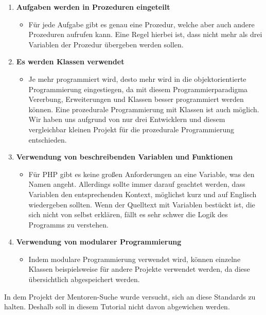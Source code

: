 \begin{enumerate}
	\item {\bf Aufgaben werden in Prozeduren eingeteilt}
	\begin{itemize}
	 \item Für jede Aufgabe gibt es genau eine Prozedur, welche aber auch andere Prozeduren aufrufen kann. Eine Regel hierbei ist, dass nicht mehr als drei Variablen der Prozedur übergeben werden sollen. 
	\end{itemize}
	\item {\bf Es werden Klassen verwendet}
	\begin{itemize}
		\item Je mehr programmiert wird, desto mehr wird in die objektorientierte Programmierung eingestiegen, da mit diesem Programmierparadigma Vererbung, Erweiterungen und Klassen besser programmiert werden können. Eine prozedurale Programmierung mit Klassen ist auch möglich. Wir haben uns aufgrund von nur drei Entwicklern und diesem vergleichbar kleinen Projekt für die prozedurale Programmierung entschieden.
	\end{itemize}
	\item {\bf Verwendung von beschreibenden Variablen und Funktionen}
	\begin{itemize}
		\item Für \gls{PHP} gibt es keine großen Anforderungen an eine Variable, was den Namen angeht. Allerdings sollte immer darauf geachtet werden, dass Variablen den entsprechenden Kontext, möglichst kurz und auf Englisch wiedergeben sollten. Wenn der Quelltext mit Variablen bestückt ist, die sich nicht von selbst erklären, fällt es sehr schwer die Logik des Programms zu verstehen.	
	\end{itemize}
	\item {\bf Verwendung von modularer Programmierung}
	\begin{itemize}
	\item	 Indem modulare Programmierung verwendet wird, können einzelne Klassen beispielsweise für andere Projekte verwendet werden, da diese übersichtlich abgespeichert werden.
	\end{itemize}
\end{enumerate}
In dem Projekt der Mentoren-Suche wurde versucht, sich an diese Standards zu halten. Deshalb soll in diesem Tutorial nicht davon abgewichen werden.
